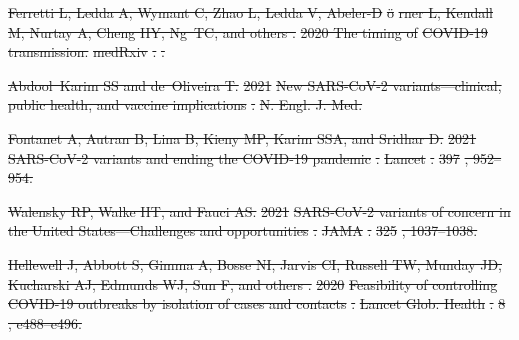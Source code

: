 \documentclass[12pt]{article}
\providecommand{\DIFdeltex}[1]{{\protect\color{red}\sout{#1}}}                      %
\providecommand{\DIFaddbegin}{} %
\providecommand{\DIFaddend}{} %
\providecommand{\DIFdelend}{} %
\providecommand{\DIFdel}[1]{\texorpdfstring{\DIFdeltex{#1}}{}} %
\newcommand{\DIFaddincludegraphics}[2][]{{\color{blue}\fbox{\DIFOincludegraphics[#1]{#2}}}} %
\DeclareRobustCommand{\DIFaddbegin}{\DIFOaddbegin \let\includegraphics\DIFaddincludegraphics} %
\DeclareRobustCommand{\DIFaddend}{\DIFOaddend \let\includegraphics\DIFOincludegraphics} %
\DeclareRobustCommand{\DIFdelend}{\DIFOaddend \let\includegraphics\DIFOincludegraphics} %
\begin{document}
\DIFdel{Ferretti L, Ledda A, Wymant C, Zhao L, Ledda V, Abeler-D}%
\DIFdel{\"o}%
\DIFdel{rner L, Kendall M,
  Nurtay A, Cheng HY, Ng~TC, and others .
}%
\DIFdel{2020 The timing of }%
\DIFdel{COVID-19}%
\DIFdel{transmission.
}%
\DIFdel{medRxiv}%
\DIFdel{.
}%
\DIFdel{.
}%

\DIFdel{Abdool~Karim SS and de~Oliveira T.
}%
\DIFdel{2021 }%
\DIFdel{New SARS-CoV-2 variants—clinical, public health, and vaccine
  implications}%
\DIFdel{.
}%
\DIFdel{N. Engl. J. Med.}%

\DIFdel{Fontanet A, Autran B, Lina B, Kieny MP, Karim SSA, and Sridhar D.
}%
\DIFdel{2021 }%
\DIFdel{SARS-CoV-2 variants and ending the COVID-19 pandemic}%
\DIFdel{.
}%
\DIFdel{Lancet}%
\DIFdel{.
}%
\DIFdel{397}%
\DIFdel{, 952--954.
}%

\DIFdel{Walensky RP, Walke HT, and Fauci AS.
}%
\DIFdel{2021 }%
\DIFdel{SARS-CoV-2 variants of concern in the United
  States---Challenges and opportunities}%
\DIFdel{.
}%
\DIFdel{JAMA}%
\DIFdel{.
}%
\DIFdel{325}%
\DIFdel{, 1037--1038.
}%

\DIFdel{Hellewell J, Abbott S, Gimma A, Bosse NI, Jarvis CI, Russell TW, Munday JD,
  Kucharski AJ, Edmunds WJ, Sun F, and others .
}%
\DIFdel{2020 }%
\DIFdel{Feasibility of controlling COVID-19 outbreaks by isolation of
  cases and contacts}%
\DIFdel{.
}%
\DIFdel{Lancet Glob. Health}%
\DIFdel{.
}%
\DIFdel{8}%
\DIFdel{, e488--e496.
}%

\DIFdelend \DIFaddbegin 
\DIFaddend 
\end{document}
